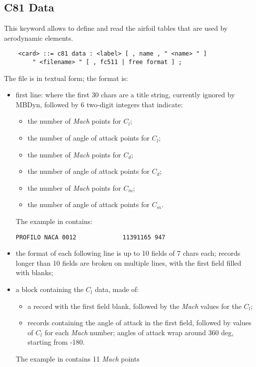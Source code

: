 \subsection{C81 Data}\label{sec:C81-DATA}
This keyword allows to define and read the  
airfoil tables that are used by aerodynamic elements.
\begin{verbatim}
    <card> ::= c81 data : <label> [ , name , " <name> " ]
        " <filename> " [ , fc511 | free format ] ;
\end{verbatim}
The file is in textual form; the format is:
\begin{itemize}
\item first line:  
where the first 30 chars are a title string, currently ignored by MBDyn,
followed by 6 two-digit integers that indicate:
	\begin{itemize}
	\item the number  of \emph{Mach} points for $C_l$;
	\item the number  of angle of attack points for $C_l$;
	\item the number  of \emph{Mach} points for $C_d$;
	\item the number  of angle of attack points for $C_d$;
	\item the number  of \emph{Mach} points for $C_m$;
	\item the number  of angle of attack points for $C_m$.
	\end{itemize}
The example in  contains:
{\small
\begin{verbatim}
PROFILO NACA 0012             11391165 947
\end{verbatim}
}
\item the format of each following line is up to 10 fields of 7 chars each;
records longer than 10 fields are broken on multiple lines,
with the first field filled with blanks;
\item a block containing the $C_l$ data, made of:
	\begin{itemize}
	\item a record with the first field blank, followed by
	the  \emph{Mach} values for the $C_l$;
	\item {} records containing the angle of attack
	in the first field, followed by  values of $C_l$
	for each \emph{Mach} number; angles of attack wrap around 
	360 deg, starting from -180.
	\end{itemize}
The example in  contains 11 \emph{Mach} points

\end{itemize}
